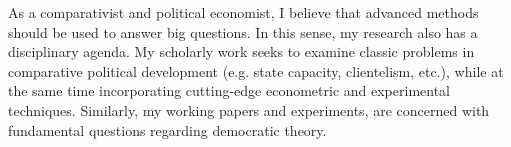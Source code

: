 As a comparativist and political economist, I believe that advanced methods should be used to answer big questions. In this sense, my research also has a disciplinary agenda. My scholarly work seeks to examine classic problems in comparative political development (e.g. state capacity, clientelism, etc.), while at the same time incorporating cutting-edge econometric and experimental techniques. Similarly, my working papers and experiments, are concerned with fundamental questions regarding democratic theory.

